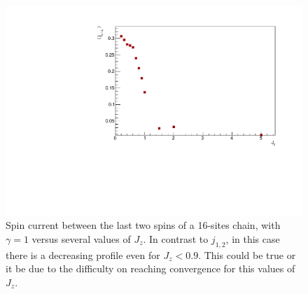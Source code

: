 \begin{figure}[H]
    \centering
    \captionsetup{width=1.\linewidth}
    \includegraphics[scale=0.6]{Figures/SpinCurrVSJzLth.pdf}
    \caption{Spin current between the last two spins of a 16-sites chain, with $\gamma=1$ versus several values of $J_z$. In contrast to $j_{1,2}$, in this case there is a decreasing profile even for $J_z < 0.9$. This could be true or it be due to the difficulty on reaching convergence for this values of $J_z$.}
    \label{fig:SpinCurrVSJzLth}
\end{figure}